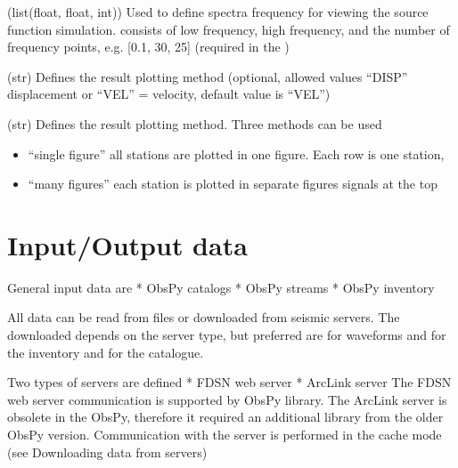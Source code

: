 \documentclass[letterpaper,10pt,english]{sphinxmanual}
\begin{document}
\begin{description}
\sphinxAtStartPar
(list(float, float, int))
Used to define spectra frequency for viewing the source function simulation.
consists of low frequency, high frequency, and the number of frequency points, e.g. {[}0.1, 30, 25{]}
(required in the )

\sphinxAtStartPar
(str)
Defines the result plotting method
(optional, allowed values “DISP” \sphinxhyphen{} displacement or “VEL” = velocity, default value is “VEL”)

\sphinxAtStartPar
(str)
Defines the result plotting method. Three methods can be used
\begin{itemize}
\item {} 
\sphinxAtStartPar
“single figure” \sphinxhyphen{} all stations are plotted in one figure. Each row is one station,

\item {} 
\sphinxAtStartPar
“many figures” \sphinxhyphen{} each station is plotted in separate figures \sphinxhyphen{} signals at the top

\end{itemize}

\end{description}

\sphinxstepscope


\chapter{Input/Output data}
\label{\detokenize{io_data:input-output-data}}\label{\detokenize{io_data:io-data}}\label{\detokenize{io_data::doc}}
\sphinxAtStartPar
General input data are
* ObsPy catalogs
* ObsPy streams
* ObsPy inventory

\sphinxAtStartPar
All data can be read from files or downloaded from seismic servers.
The downloaded depends on the server type,
but preferred are  for waveforms and  for the inventory
and  for the catalogue.

\sphinxAtStartPar
Two types of servers are defined
* FDSN web server
* ArcLink server
The FDSN web server communication is supported by ObsPy library.
The ArcLink server is obsolete in the ObsPy, therefore it required an additional library
from the older ObsPy version. Communication with the server is performed in the cache mode
(see Downloading data from servers)
\end{document}
